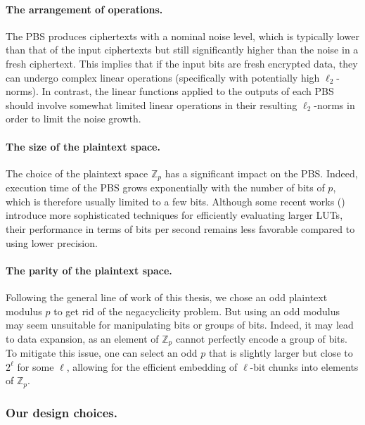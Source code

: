 \paragraph{The arrangement of operations.} The \gls{PBS} produces ciphertexts with a nominal noise level, which is typically lower than that of the input ciphertexts but still significantly higher than the noise in a fresh ciphertext. This implies that if the input bits are fresh encrypted data, they can undergo complex linear operations (specifically with potentially high $\ell_2$-norms). In contrast, the linear functions applied to the outputs of each \gls{PBS} should involve somewhat limited linear operations in their resulting  $\ell_2$-norms in order to limit the noise growth.

\paragraph{The size of the plaintext space.} The choice of the plaintext space $\mathbb{Z}_p$ has a significant impact on the \gls{PBS}. Indeed, execution time of the \gls{PBS} grows exponentially with the number of bits of $p$, which is therefore usually limited to a few bits. Although some recent works (\cite{TCHES:GuiBorAra21,AC:CLOT21,EPRINT:CZBSG22,TCHES:KluSch23}) introduce more sophisticated techniques for efficiently evaluating larger LUTs, their performance in terms of bits per second remains less favorable compared to using lower precision.


\paragraph{The parity of the plaintext space.} Following the general line of work of this thesis, we chose an odd plaintext modulus $p$ to get rid of the negacyclicity problem. But using an odd modulus may seem unsuitable for manipulating bits or groups of bits. Indeed, it may lead to data expansion, as an element of \( \mathbb{Z}_p \) cannot perfectly encode a group of bits. To mitigate this issue, one can select an odd $p$ that is slightly larger but close to $2^\ell$ for some $\ell$, allowing for the efficient embedding of $\ell$-bit chunks into elements of $\mathbb{Z}_p$. 


\subsubsection{Our design choices.} 

